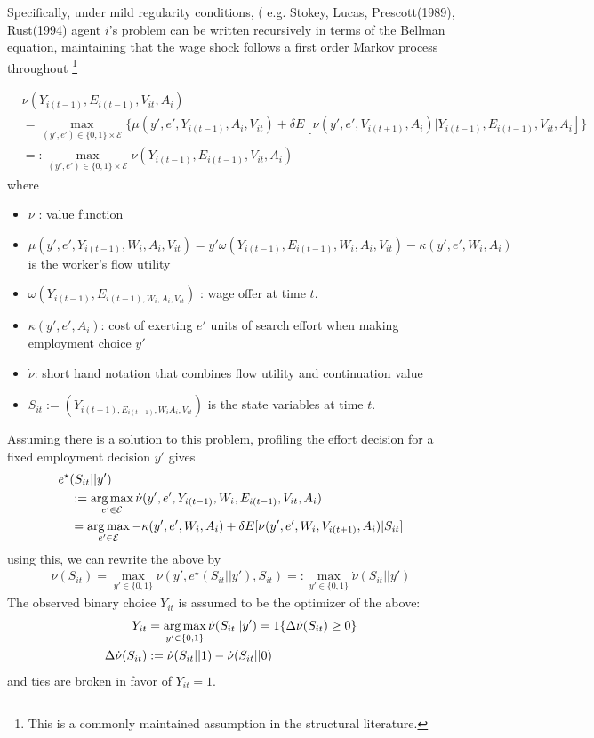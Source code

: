 \documentclass{article}
\begin{document}
Specifically, under mild regularity conditions, ( e.g. \cite{cite}Stokey, Lucas, Prescott(1989), Rust(1994) agent $i$'s problem can be written recursively in terms of the Bellman equation, maintaining that the wage shock follows a first order Markov process throughout \footnote{This is a commonly maintained assumption in the structural literature.}

\begin{align}
    \label{eq: bellman1}
    &\nu(Y_{i(t-1)}, E_{i(t-1)}, V_{it}, A_i) \\
    &= \max_{(y', e') \in \{0,1\} \times \mathcal{E}} \{ \mu(y', e', Y_{i(t-1)},A_i, V_{it} )  + \delta E[ \nu(y', e', V_{i(t+1)}, A_i) | Y_{i(t-1)}, E_{i(t-1)},V_{it}, A_i ] \}\\ 
    &=: \max_{ (y', e') \in \{0,1\} \times \mathcal{E} }\dot{\nu}( Y_{i(t-1)}, E_{i(t-1)}, V_{it}, A_i)
\end{align}
where
\begin{itemize}
    \item $\nu$ : value function 
    \item $\mu(y', e', Y_{i(t-1)},W_i,A_i, V_{it} ) = y' \omega (Y_{i(t-1)}, E_{i(t-1)}, W_i,A_i, V_{it}) - \kappa( y', e', W_i,A_i)$ is the worker's flow utility
    \item $\omega (Y_{i(t-1)}, E_{i(t-1), W_i,A_i, V_{it}})$ : wage offer at time $t$.
    \item $\kappa( y', e', A_i)$: cost of exerting $e'$ units of search effort when making employment choice $y'$
    \item $\dot{\nu} $: short hand notation that combines flow utility and continuation value 
    \item $S_{it}:= (Y_{i(t-1), E_{i(t-1)},W_i A_i, V_{it}})$ is the state variables at time $t$.
\end{itemize}


Assuming there is a solution to this problem, profiling the effort decision for a fixed employment decision $y'$ gives
\begin{align}
    \label{eq:estar1}
     &e^ \star  (S_{it} || y' ) \\
     &\quad: = \operatorname*{arg\,max} _ { e' \in \mathcal{ E} } \dot{ \nu} ( y', e' , Y_{i (t-1) } , W_i , E_ { i(t-1) } , V_{it}, A_ i )\\
    &\quad= \operatorname*{arg\,max} _ { e' \in \mathcal{ E} } - \kappa ( y' , e', W_i, A_i ) + \delta E[ \nu ( y' , e' ,W_i, V_{ i (t+1) } , A_i ) | S_{it} ]
\end{align}
using this, we can rewrite the above by
\begin{align*}
    \nu(S_{it} ) = \max_{ y' \in \{ 0,1 \} } \dot{\nu} ( y' , e^\star ( S_{it} || y' ) , S_{it} ) =: \max _{ y' \in \{ 0,1 \} } \dot{ \nu} ( S_{it} || y' )
\end{align*}
The observed binary choice $ Y_{it}$ is assumed to be the optimizer of the above: 
\begin{align*}
    Y_{it} &= \operatorname*{arg\,max}_{ y' \in \{0,1 \}} \dot{ \nu } ( S_{it} || y' ) = 1\{ \Delta \dot{ \nu} ( S_{it}) \geq 0 \}  \\
\Delta \dot{\nu} ( S_{it} ) &: = \dot{ \nu} ( S_{it} || 1) - \dot{\nu} (S_{it} || 0 )
\end{align*}
and ties are broken in favor of $Y_{it} =1$.
\end{document}
